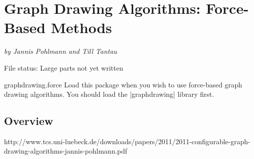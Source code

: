 %
%
%

\section{Graph Drawing Algorithms: Force-Based Methods}
\label{section-library-graphdrawing-force-based}

{\emph{by Jannis Pohlmann and Till Tantau}}


File status: Large parts not yet written

\begin{tikzlibrary}{graphdrawing.force}
  Load this package when you wish to use force-based graph drawing
  algorithms. You should load the |graphdrawing| library first.
\end{tikzlibrary}

\subsection{Overview}


http://www.tcs.uni-luebeck.de/downloads/papers/2011/2011-configurable-graph-drawing-algorithms-jannis-pohlmann.pdf






